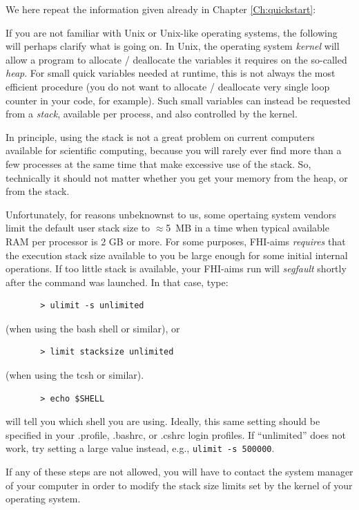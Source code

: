 We here repeat the information given already in Chapter \ref{Ch:quickstart}:

If you are not familiar with Unix or Unix-like operating systems, the
following will perhaps clarify what is going on. In Unix, the
operating system \emph{kernel} will allow a program to allocate /
deallocate the variables it requires on the so-called \emph{heap}. For
small quick variables needed at runtime, this is not always the most
efficient procedure (you do not want to allocate / deallocate very
single loop counter in your code, for example). Such small variables
can instead be requested from a \emph{stack}, available per process,
and also controlled by the kernel.

In principle, using the stack is not a great problem on current
computers available for scientific computing, because you will rarely
ever find more than a few processes at the same time that make
excessive use of the stack. So, technically it should not matter
whether you get your memory from the heap, or from the stack.

Unfortunately, for reasons unbeknownst to us, some opertaing system
vendors limit the  default user stack size to $\approx$5~MB in a time
when typical available RAM per processor is 2 GB or more. 
For some purposes, FHI-aims \emph{requires} that the execution stack
size available to you be large enough for some initial internal
operations. If too little stack is available, your FHI-aims run will
\emph{segfault} shortly after the command was launched. In that case,
type: 
    \begin{verbatim}
       > ulimit -s unlimited
    \end{verbatim}
    (when using the bash shell or similar), or
    \begin{verbatim}
       > limit stacksize unlimited
    \end{verbatim}
    (when using the tcsh or similar). 
    \begin{verbatim}
       > echo $SHELL
    \end{verbatim}
will tell you which shell you are using. Ideally, this same setting should
be specified in your .profile, .bashrc, or .cshrc login profiles. If
``unlimited'' does not work, try setting a large value instead, e.g.,
\texttt{ulimit -s 500000}.

If any of these steps are not allowed, you will have to contact the
system manager of your computer in order to modify the stack size
limits set by the kernel of your operating system. 

